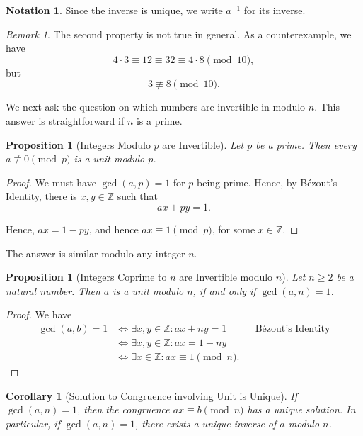 \documentclass{article}
\newtheorem{proposition}[theorem]{Proposition}
\newtheorem{corollary}[theorem]{Corollary}
\theoremstyle{definition}
\newtheorem{notation}[theorem]{Notation}
\theoremstyle{remark}
\newtheorem{remark}[theorem]{Remark}
\newcommand{\pqty}[1]{\left(#1\right)}
\newcommand{\inverse}{^{-1}}
\newcommand{\nequiv}{\not\equiv}
\newcommand{\ZZ}{\mathbb{Z}}
\begin{document}
\begin{notation}
    Since the inverse is unique, we write \(a\inverse\) for its inverse.
\end{notation}

\begin{remark}
    The second property is not true in general. As a counterexample, we have
    \[
        4 \cdot 3 \equiv 12 \equiv 32 \equiv 4 \cdot 8 \pmod{10},
    \]
    but
    \[
        3 \nequiv 8 \pmod{10}.
    \]
\end{remark}

We next ask the question on which numbers are invertible in modulo \(n\). This answer is straightforward if \(n\) is a prime.

\begin{proposition}[Integers Modulo \(p\) are Invertible]
    Let \(p\) be a prime. Then every \(a \nequiv 0 \pmod{p}\) is a unit modulo \(p\).
\end{proposition}

\begin{proof}
    We must have \(\gcd\pqty{a, p} = 1\) for \(p\) being prime. Hence, by B\'{e}zout's Identity, there is \(x, y \in \ZZ\) such that
    \[
        ax + py = 1.
    \]
    
    Hence, \(ax = 1 - py\), and hence \(ax \equiv 1 \pmod{p}\), for some \(x \in \ZZ\).
\end{proof}

The answer is similar modulo any integer \(n\).

\begin{proposition}[Integers Coprime to \(n\) are Invertible modulo \(n\)]
    Let \(n \geq 2\) be a natural number. Then \(a\) is a unit modulo \(n\), if and only if \(\gcd\pqty{a, n} = 1\).
\end{proposition}

\begin{proof}
    We have
    \begin{align*}
        \gcd\pqty{a, b} = 1 &\iff \exists x, y \in \ZZ: ax + ny = 1 && \text{B\'{e}zout's Identity} \\
        &\iff \exists x, y \in \ZZ: ax = 1 - ny \\
        &\iff \exists x \in \ZZ: ax \equiv 1 \pmod{n}.
    \end{align*}
\end{proof}

\begin{corollary}[Solution to Congruence involving Unit is Unique]
    If \(\gcd\pqty{a, n} = 1\), then the congruence \(ax \equiv b \pmod{n}\) has a unique solution. In particular, if \(\gcd\pqty{a, n} = 1\), there exists a unique inverse of \(a\) modulo \(n\).
\end{corollary}
\end{document}
